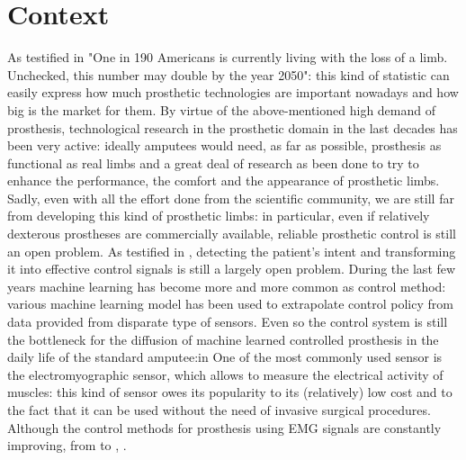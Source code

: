 \section{Context}\label{s:context}
As testified in \cite{ZIEGLERGRAHAM2008422} "One in 190 Americans is currently living with the loss of a limb. Unchecked, this number may double by the year 2050": this kind of statistic can easily express how much prosthetic technologies are important nowadays and how big is the market for them.
By virtue of the above-mentioned high demand of prosthesis, technological research in the prosthetic domain in the last decades has been very active: ideally amputees would need, as far as possible, prosthesis as functional as real limbs and a great deal of research as been done to try to enhance the performance, the comfort and the appearance of prosthetic limbs. Sadly, even with all the effort done from the scientific community, we are still far from developing this kind of prosthetic limbs: in particular, even if relatively dexterous prostheses are commercially available, reliable prosthetic control is still an open problem. As testified in \cite{castellini2016upper}, detecting the patient's intent and transforming it into effective control signals is still a largely open problem. During the last few years machine learning has become more and more common as control method: various machine learning model has been used to extrapolate control policy from data provided from disparate type of sensors. Even so the control system is still the bottleneck for the diffusion of machine learned controlled prosthesis in the daily life of the standard amputee:in
One of the most commonly used sensor is the electromyographic sensor, which allows to measure the electrical activity of muscles: this kind of sensor owes its popularity to its (relatively) low cost and to the fact that it can be used without the need of invasive surgical procedures. Although the control methods for prosthesis using EMG signals are constantly improving, from \cite{Zecca2002} to \cite{Strazzulla2017}, . 